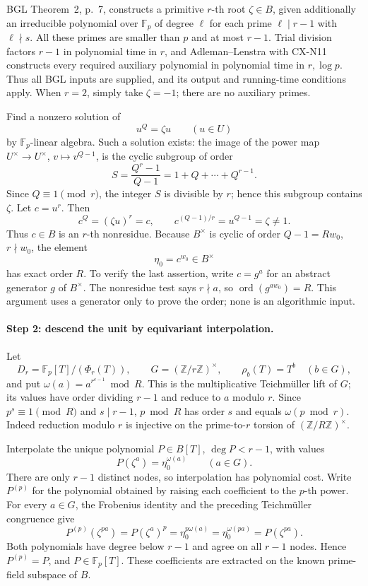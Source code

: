 BGL Theorem~2, p.~7, constructs a primitive \(r\)-th root
\(\zeta\in B\), given additionally an irreducible polynomial
over \(\mathbb F_p\) of degree \(\ell\) for each prime
\(\ell\mid r-1\) with \(\ell\nmid s\).
All these primes are smaller than \(p\) and at most \(r-1\).
Trial division factors \(r-1\) in polynomial time in \(r\),
and Adleman--Lenstra with CX-N11 constructs every required
auxiliary polynomial in polynomial time in \(r,\log p\).
Thus all BGL inputs are supplied, and its output and running-time
conditions apply. When \(r=2\), simply take \(\zeta=-1\);
there are no auxiliary primes.

Find a nonzero solution of
\[
 u^Q=\zeta u\qquad (u\in U)
\]
by \(\mathbb F_p\)-linear algebra.
Such a solution exists: the image of the power map
\(U^\times\to U^\times\), \(v\mapsto v^{Q-1}\), is the
cyclic subgroup of order
\[
 S=\frac{Q^r-1}{Q-1}=1+Q+\cdots+Q^{r-1}.
\]
Since \(Q\equiv1\pmod r\), the integer \(S\) is divisible
by \(r\); hence this subgroup contains \(\zeta\).
Let \(c=u^r\). Then
\[
 c^Q=(\zeta u)^r=c,
 \qquad c^{(Q-1)/r}=u^{Q-1}=\zeta\ne1.
\]
Thus \(c\in B\) is an \(r\)-th nonresidue.
Because \(B^\times\) is cyclic of order \(Q-1=R w_0\),
\(r\nmid w_0\), the element
\[
 \eta_0=c^{w_0}\in B^\times
\]
has exact order \(R\).
To verify the last assertion, write \(c=g^a\) for an abstract
generator \(g\) of \(B^\times\).
The nonresidue test says \(r\nmid a\), so
\(\operatorname{ord}(g^{a w_0})=R\).
This argument uses a generator only to prove the order; none is
an algorithmic input.

\paragraph{Step 2: descend the unit by equivariant interpolation.}
Let
\[
 D_r=\mathbb F_p[T]/(\Phi_r(T)),\qquad
 G=(\mathbb Z/r\mathbb Z)^\times,
 \qquad \rho_b(T)=T^b\quad(b\in G),
\]
and put \(\omega(a)=a^{r^{e-1}}\bmod R\).
This is the multiplicative Teichm\"uller lift of \(G\); its
values have order dividing \(r-1\) and reduce to \(a\) modulo
\(r\).
Since \(p^s\equiv1\pmod R\) and \(s\mid r-1\),
\(p\bmod R\) has order \(s\) and equals
\(\omega(p\bmod r)\).
Indeed reduction modulo \(r\) is injective on the
prime-to-\(r\) torsion of \((\mathbb Z/R\mathbb Z)^\times\).

Interpolate the unique polynomial \(P\in B[T]\),
\(\deg P<r-1\), with values
\[
 P(\zeta^a)=\eta_0^{\omega(a)}\qquad(a\in G).
\]
There are only \(r-1\) distinct nodes, so interpolation has
polynomial cost.
Write \(P^{(p)}\) for the polynomial obtained by raising each
coefficient to the \(p\)-th power.
For every \(a\in G\), the Frobenius identity and the preceding
Teichm\"uller congruence give
\[
 P^{(p)}(\zeta^{pa})
   =P(\zeta^a)^p
   =\eta_0^{p\omega(a)}
   =\eta_0^{\omega(pa)}
   =P(\zeta^{pa}).
\]
Both polynomials have degree below \(r-1\) and agree on all
\(r-1\) nodes. Hence \(P^{(p)}=P\), and
\(P\in\mathbb F_p[T]\).
These coefficients are extracted on the known prime-field
subspace of \(B\).

